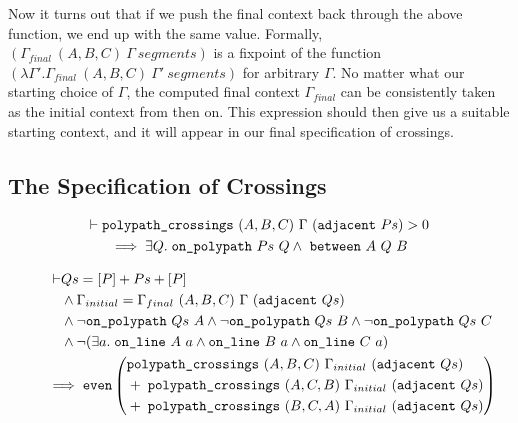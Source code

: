 Now it turns out that if we push the final context back through the above function, we end up with the same value. Formally, $(\Gamma_{final}\ (A,B,C)\ \Gamma\ segments)$ is a fixpoint of the function $(\lambda \Gamma'. \Gamma_{final}\ (A,B,C)\ \Gamma'\ segments)$ for arbitrary $\Gamma$. No matter what our starting choice of $\Gamma$, the computed final context $\Gamma_{final}$ can be consistently taken as the initial context from then on. This expression should then give us a suitable starting context, and it will appear in our final specification of crossings.

\subsection{The Specification of Crossings}
\begin{figure}
  \begin{multline}\label{eq:crossNZIntersect}
    \vdash\texttt{polypath\_crossings}\ (A,B,C)\ \Gamma\ (\texttt{adjacent}\ Ps) > 0\\
    \implies \exists Q. \; \texttt{on\_polypath}\ Ps\ Q \wedge\ \texttt{between}\ A\ Q\ B
  \end{multline}

  \begin{multline}\label{eq:polypathCrossingsEven}
  \begin{aligned}
    \vdash&Qs = [P] + Ps + [P]\\
    &\wedge \Gamma_{initial} = \Gamma_{final}\ (A,B,C)\ \Gamma\ (\texttt{adjacent}\ Qs)\\
    &\wedge \neg\texttt{on\_polypath}\ Qs\ A \wedge \neg\texttt{on\_polypath}\ Qs\ B \wedge \neg\texttt{on\_polypath}\ Qs\ C\\
    &\wedge \neg(\exists a.\; \texttt{on\_line}\ A\ a\wedge \texttt{on\_line}\ B\ a\wedge \texttt{on\_line}\ C\ a)
\end{aligned}\\
\implies\texttt{even}\left(\begin{aligned}& \texttt{polypath\_crossings}\ (A,B,C)\ \Gamma_{initial}\ (\texttt{adjacent}\ Qs)\\
    &+\;\texttt{polypath\_crossings}\ (A,C,B)\ \Gamma_{initial}\ (\texttt{adjacent}\ Qs)\\
    &+\;\texttt{polypath\_crossings}\ (B,C,A)\ \Gamma_{initial}\ (\texttt{adjacent}\ Qs)
  \end{aligned}\right)
\end{multline}


\end{figure}
